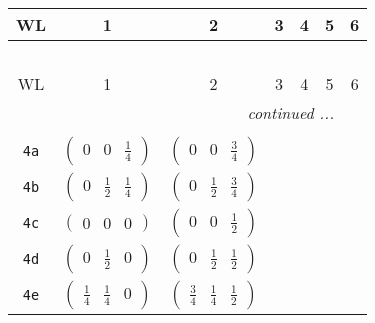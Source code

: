 \documentclass[fleqn,9pt,landscape]{jsarticle}
\begin{document}
\begin{center}
\renewcommand{\arraystretch}{1.2}
\begin{longtable}{ccccccc}
 \hline \hline
WL & 1 & 2 & 3 & 4 & 5 & 6 \\ \hline \endfirsthead

\multicolumn{6}{l}{\tablename\ \thetable{}} \\
 \hline \hline
WL & 1 & 2 & 3 & 4 & 5 & 6 \\ \hline \endhead

 \hline \hline
\multicolumn{6}{r}{\footnotesize\it continued ...} \\ \endfoot

 \hline \hline
\multicolumn{6}{r}{} \\ \endlastfoot

{\tt 4a} & $ \begin{pmatrix} 0 & 0 & \frac{1}{4} \end{pmatrix} $ & $ \begin{pmatrix} 0 & 0 & \frac{3}{4} \end{pmatrix} $ & $  $ & $  $ & $  $ & $  $ \\ \hline
{\tt 4b} & $ \begin{pmatrix} 0 & \frac{1}{2} & \frac{1}{4} \end{pmatrix} $ & $ \begin{pmatrix} 0 & \frac{1}{2} & \frac{3}{4} \end{pmatrix} $ & $  $ & $  $ & $  $ & $  $ \\ \hline
{\tt 4c} & $ \begin{pmatrix} 0 & 0 & 0 \end{pmatrix} $ & $ \begin{pmatrix} 0 & 0 & \frac{1}{2} \end{pmatrix} $ & $  $ & $  $ & $  $ & $  $ \\ \hline
{\tt 4d} & $ \begin{pmatrix} 0 & \frac{1}{2} & 0 \end{pmatrix} $ & $ \begin{pmatrix} 0 & \frac{1}{2} & \frac{1}{2} \end{pmatrix} $ & $  $ & $  $ & $  $ & $  $ \\ \hline
{\tt 4e} & $ \begin{pmatrix} \frac{1}{4} & \frac{1}{4} & 0 \end{pmatrix} $ & $ \begin{pmatrix} \frac{3}{4} & \frac{1}{4} & \frac{1}{2} \end{pmatrix} $ & $  $ & $  $ & $  $ & $  $ \\ \hline

\end{longtable}
\end{center}
\end{document}
